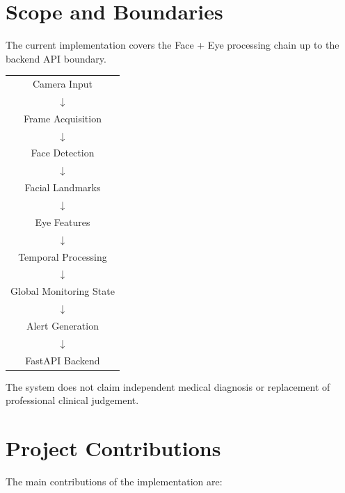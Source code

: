 \documentclass{tietreport}
\begin{document}

\section{Scope and Boundaries}

The current implementation covers the Face + Eye processing chain up
to the backend API boundary.

\begin{center}

\begin{tabular}{c}

Camera Input\\
$\downarrow$\\
Frame Acquisition\\
$\downarrow$\\
Face Detection\\
$\downarrow$\\
Facial Landmarks\\
$\downarrow$\\
Eye Features\\
$\downarrow$\\
Temporal Processing\\
$\downarrow$\\
Global Monitoring State\\
$\downarrow$\\
Alert Generation\\
$\downarrow$\\
FastAPI Backend

\end{tabular}

\end{center}

The system does not claim independent medical diagnosis or replacement
of professional clinical judgement.


\section{Project Contributions}

The main contributions of the implementation are:
\end{document}
